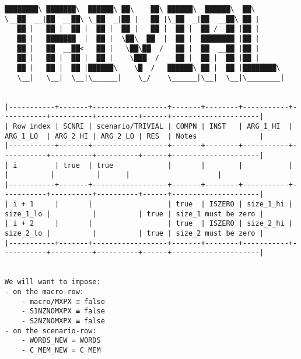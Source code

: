 \documentclass[varwidth=\maxdimen,margin=0.5cm,multi={verbatim}]{standalone}
\begin{document}
\begin{verbatim}
████████\ ███████\  ██████\ ██\    ██\ ██████\  ██████\  ██\
\__██  __|██  __██\ \_██  _|██ |   ██ |\_██  _|██  __██\ ██ |
   ██ |   ██ |  ██ |  ██ |  ██ |   ██ |  ██ |  ██ /  ██ |██ |
   ██ |   ███████  |  ██ |  \██\  ██  |  ██ |  ████████ |██ |
   ██ |   ██  __██<   ██ |   \██\██  /   ██ |  ██  __██ |██ |
   ██ |   ██ |  ██ |  ██ |    \███  /    ██ |  ██ |  ██ |██ |
   ██ |   ██ |  ██ |██████\    \█  /   ██████\ ██ |  ██ |████████\
   \__|   \__|  \__|\______|    \_/    \______|\__|  \__|\________|


|-----------+-------+------------------+-------+--------+-----------+-----------+----------+----------+------+---------------------|
| Row index | SCNRI | scenario/TRIVIAL | COMPN | INST   | ARG_1_HI  | ARG_1_LO  | ARG_2_HI | ARG_2_LO | RES  | Notes               |
|-----------+-------+------------------+-------+--------+-----------+-----------+----------+----------+------+---------------------|
| i         | true  | true             |       |        |           |           |          |          |      |                     |
|-----------+-------+------------------+-------+--------+-----------+-----------+----------+----------+------+---------------------|
| i + 1     |       |                  | true  | ISZERO | size_1_hi | size_1_lo |          |          | true | size_1 must be zero |
| i + 2     |       |                  | true  | ISZERO | size_2_hi | size_2_lo |          |          | true | size_2 must be zero |
|-----------+-------+------------------+-------+--------+-----------+-----------+----------+----------+------+---------------------|


We will want to impose:
- on the macro-row:
	- macro/MXPX ≡ false
	- S1NZNOMXPX ≡ false
	- S2NZNOMXPX ≡ false
- on the scenario-row:
	- WORDS_NEW = WORDS
	- C_MEM_NEW = C_MEM

\end{verbatim}
\end{document}
